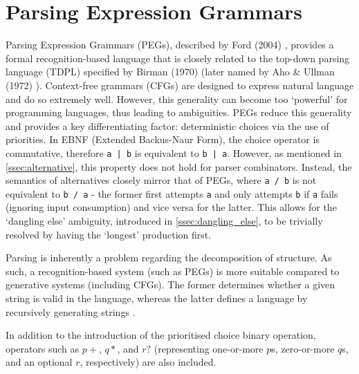 \section{Parsing Expression Grammars}
\label{sec:peg}

Parsing Expression Grammars (PEGs), described by Ford (2004) \cite{ford04}, provides a formal recognition-based language that is closely related to the top-down parsing language (TDPL) specified by Birman (1970) \cite{birman70} (later named by Aho \& Ullman (1972) \cite{aho72}). %
Context-free grammars (CFGs) are designed to express natural language and do so extremely well.
However, this generality can become too `powerful' for programming languages, thus leading to ambiguities.
PEGs reduce this generality and provides a key differentiating factor: deterministic choices via the use of priorities.
In EBNF (Extended Backus-Naur Form), the choice operator is commutative, therefore \texttt{a | b} is equivalent to \texttt{b | a}.
However, as mentioned in \autoref{ssec:alternative}, this property does not hold for parser combinators.
Instead, the semantics of alternatives closely mirror that of PEGs, where \texttt{a / b} is not equivalent to \texttt{b / a} - the former first attempts \texttt{a} and only attempts \texttt{b} if \texttt{a} fails (ignoring input consumption) and vice versa for the latter.
This allows for the `dangling else' ambiguity, introduced in \autoref{ssec:dangling_else}, to be trivially resolved by having the `longest' production first.

Parsing is inherently a problem regarding the decomposition of structure.
As such, a recognition-based system (such as PEGs) is more suitable compared to generative systems (including CFGs).
The former determines whether a given string is valid in the language, whereas the latter defines a language by recursively generating strings \cite{ford04}.

In addition to the introduction of the prioritised choice binary operation, operators such as $p+$, $q*$, and $r?$ (representing one-or-more $p$s, zero-or-more $q$s, and an optional $r$, respectively) are also included.